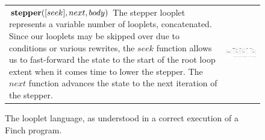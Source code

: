 \begin{figure}[ht]
\begin{tabular} {|l|c|}
\begin{minipage}[c]{0.25\linewidth}
    \end{minipage} \\ \hline
    \begin{minipage}[c]{0.65\linewidth}
        $\text{\textbf{stepper}}([seek], next, body)$ The stepper looplet
        represents a variable number of looplets, concatenated. Since our
        looplets may be skipped over due to conditions or various rewrites, the
        $seek$ function allows us to fast-forward the state to the start of the
        root loop extent when it comes time to lower the stepper. The $next$
        function advances the state to the next iteration of the stepper. 
    \end{minipage} &
    \begin{minipage}[c]{0.25\linewidth}
        \centering
        \includegraphics[scale=0.20]{Looplets-stepper.png}
    \end{minipage} \\\hline
\end{tabular}
\endgroup
\vspace{-8pt}
\caption{The looplet language, as understood in a correct execution of a Finch program.}
\end{figure}